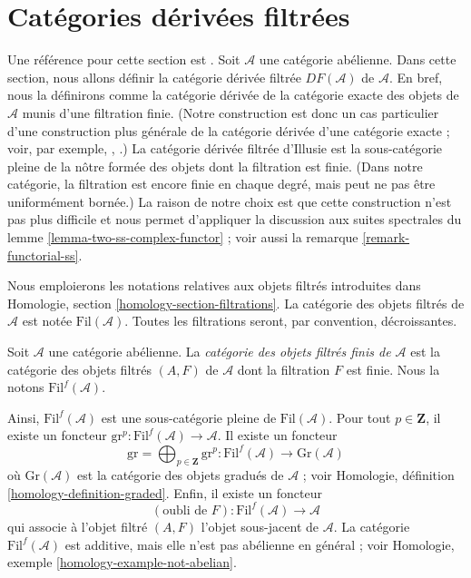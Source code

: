 \section{Catégories dérivées filtrées}
\label{section-filtered-derived-category}

\noindent
Une référence pour cette section est \cite[I, Chapter V]{cotangent}. Soit
$\mathcal{A}$ une catégorie abélienne. Dans cette section, nous allons définir
la catégorie dérivée filtrée $DF(\mathcal{A})$ de $\mathcal{A}$. En bref, nous
la définirons comme la catégorie dérivée de la catégorie exacte des objets de
$\mathcal{A}$ munis d'une filtration finie. (Notre construction est donc un
cas particulier d'une construction plus générale de la catégorie dérivée
d'une catégorie exacte ; voir, par exemple, \cite{Buhler}, \cite{Keller}.) La
catégorie dérivée filtrée d'Illusie est la sous-catégorie pleine de la nôtre
formée des objets dont la filtration est finie. (Dans notre catégorie, la
filtration est encore finie en chaque degré, mais peut ne pas être uniformément
bornée.) La raison de notre choix est que cette construction n'est pas plus
difficile et nous permet d'appliquer la discussion aux suites spectrales du
lemme \ref{lemma-two-ss-complex-functor} ; voir aussi la
remarque \ref{remark-functorial-ss}.

\medskip\noindent
Nous emploierons les notations relatives aux objets filtrés introduites dans
Homologie, section \ref{homology-section-filtrations}. La catégorie des objets
filtrés de $\mathcal{A}$ est notée $\text{Fil}(\mathcal{A})$. Toutes les
filtrations seront, par convention, décroissantes.

\begin{definition}
\label{definition-finite-filtered}
Soit $\mathcal{A}$ une catégorie abélienne. La
{\it catégorie des objets filtrés finis de $\mathcal{A}$} est la catégorie des
objets filtrés $(A, F)$ de $\mathcal{A}$ dont la filtration $F$ est finie. Nous
la notons $\text{Fil}^f(\mathcal{A})$.
\end{definition}

\noindent
Ainsi, $\text{Fil}^f(\mathcal{A})$ est une sous-catégorie pleine de
$\text{Fil}(\mathcal{A})$. Pour tout $p \in \mathbf{Z}$, il existe un foncteur
$\text{gr}^p : \text{Fil}^f(\mathcal{A}) \to \mathcal{A}$. Il existe un
foncteur
$$
\text{gr} = \bigoplus\nolimits_{p \in \mathbf{Z}} \text{gr}^p :
\text{Fil}^f(\mathcal{A}) \to \text{Gr}(\mathcal{A})
$$
où $\text{Gr}(\mathcal{A})$ est la catégorie des objets gradués de
$\mathcal{A}$ ; voir Homologie, définition
\ref{homology-definition-graded}. Enfin, il existe un foncteur
$$
(\text{oubli de }F) : \text{Fil}^f(\mathcal{A}) \longrightarrow \mathcal{A}
$$
qui associe à l'objet filtré $(A, F)$ l'objet sous-jacent de $\mathcal{A}$.
La catégorie $\text{Fil}^f(\mathcal{A})$ est additive, mais elle n'est pas
abélienne en général ; voir Homologie, exemple
\ref{homology-example-not-abelian}.

